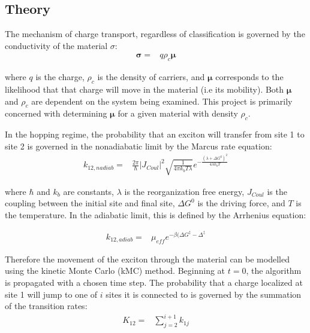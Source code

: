 \documentclass{article}
\begin{document}
\subsection{Theory}

The mechanism of charge transport, regardless of classification is governed by the conductivity of the material $\sigma$:
\begin{align}
    \mathbf{\sigma}=&q\rho_c\mathbf{\mu}
\end{align}

where $q$ is the charge, $\rho_c$ is the density of carriers, and $\mathbf{\mu}$ corresponds to the likelihood that that charge will move in the material (i.e its mobility).\cite{Oberhofer2017ChargeMethods} Both $\mathbf{\mu}$ and $\rho_c$ are dependent on the system being examined. This project is primarily concerned with determining $\mathbf{\mu}$ for a given material with density $\rho_c$. 

In the hopping regime, the probability that an exciton will transfer from site 1 to site 2 is governed in the nonadiabatic limit by the Marcus rate equation:\cite{Marcus1956OnIN}
\begin{align}
    k_{12,nadiab}=&\frac{2\pi}{\hbar}|J_{Coul}|^2\sqrt{\frac{1}{4\pi k_b T \lambda}}e^{-\frac{(\lambda +\Delta G^0)^2}{4\lambda k_b T}}
\end{align}

where $\hbar$ and $k_b$ are constants, $\lambda$ is the reorganization free energy, $J_{Coul}$ is the coupling between the initial site and final site, $\Delta G^0$ is the driving force, and $T$ is the temperature. In the adiabatic limit, this is defined by the Arrhenius equation:\cite{Baumeier2012StochasticNetworks}

\begin{align}
    k_{12,adiab}=&\mu_{eff}e^{-\beta(\Delta G^{\ddag}-\Delta^\ddag}
\end{align}

Therefore the movement of the exciton through the material can be modelled using the kinetic Monte Carlo (kMC) method.\cite{Oberhofer2017ChargeMethods} Beginning at $t=0$, the algorithm is propagated with a chosen time step. The probability that a charge localized at site 1 will jump to one of $i$ sites it is connected to is governed by the summation of the transition rates:
\begin{align}
    K_{12}=&\sum_{j=2}^{i+1} k_{1j}
\end{align}
\end{document}
